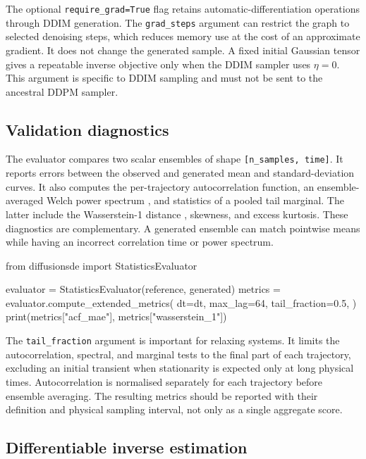 The optional \texttt{require\_grad=True} flag retains automatic-differentiation
operations through DDIM generation. The \texttt{grad\_steps} argument can restrict
the graph to selected denoising steps, which reduces memory use at the cost of an
approximate gradient. It does not change the generated sample. A fixed initial
Gaussian tensor gives a repeatable inverse objective only when the DDIM sampler
uses $\eta=0$. This argument is specific to DDIM sampling and must not be sent to
the ancestral DDPM sampler.

\subsection{Validation diagnostics}

The evaluator compares two scalar ensembles of shape \texttt{[n\_samples, time]}.
It reports errors between the observed and generated mean and standard-deviation
curves. It also computes the per-trajectory autocorrelation function, an
ensemble-averaged Welch power spectrum \cite{welch1967psd}, and statistics of a
pooled tail marginal. The latter include the Wasserstein-1 distance
\cite{villani2009optimal}, skewness, and excess kurtosis. These diagnostics are
complementary. A generated ensemble can match pointwise means while having an
incorrect correlation time or power spectrum.

\begin{pythonlisting}
from diffusionsde import StatisticsEvaluator

evaluator = StatisticsEvaluator(reference, generated)
metrics = evaluator.compute_extended_metrics(
    dt=dt,
    max_lag=64,
    tail_fraction=0.5,
)
print(metrics["acf_mae"], metrics["wasserstein_1"])
\end{pythonlisting}

The \texttt{tail\_fraction} argument is important for relaxing systems. It limits
the autocorrelation, spectral, and marginal tests to the final part of each
trajectory, excluding an initial transient when stationarity is expected only at
long physical times. Autocorrelation is normalised separately for each trajectory
before ensemble averaging. The resulting metrics should be reported with their
definition and physical sampling interval, not only as a single aggregate score.

\subsection{Differentiable inverse estimation}

